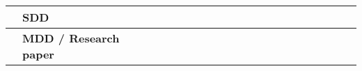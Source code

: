 \begin{table}[ht!]
\begin{tabular}{lp{2.5in}|llllllllllllllllllll|}
    \multicolumn{1}{|l|}{\cellcolor[HTML]{00E2FF}\textbf{}}                & \cellcolor[HTML]{00E2FF}\textbf{SDD}                                       & \multicolumn{1}{l|}{}                                   & \multicolumn{1}{l|}{}                                   & \multicolumn{1}{l|}{}                                   & \multicolumn{1}{l|}{\cellcolor[HTML]{F8A102}}           & \multicolumn{1}{l|}{\cellcolor[HTML]{F8A102}}           & \multicolumn{1}{l|}{\cellcolor[HTML]{F8A102}}           & \multicolumn{1}{l|}{}                                   & \multicolumn{1}{l|}{}                                   & \multicolumn{1}{l|}{}                                   & \multicolumn{1}{l|}{}                                    & \multicolumn{1}{l|}{}                                    & \multicolumn{1}{l|}{}                                    & \multicolumn{1}{l|}{}                                    & \multicolumn{1}{l|}{}                                    & \multicolumn{1}{l|}{}                                    & \multicolumn{1}{l|}{}                                    & \multicolumn{1}{l|}{}                                    & \multicolumn{1}{l|}{}                                    & \multicolumn{1}{l|}{}                                    &             \\ \hline
    \multicolumn{1}{|l|}{\cellcolor[HTML]{00E2FF}\textbf{}}                & \cellcolor[HTML]{00E2FF}\textbf{MDD / Research paper}                                       & \multicolumn{1}{l|}{}                                   & \multicolumn{1}{l|}{}                                   & \multicolumn{1}{l|}{}                                   & \multicolumn{1}{l|}{}                                   & \multicolumn{1}{l|}{}                                   & \multicolumn{1}{l|}{}                                   & \multicolumn{1}{l|}{\cellcolor[HTML]{F8A102}}           & \multicolumn{1}{l|}{\cellcolor[HTML]{F8A102}}           & \multicolumn{1}{l|}{\cellcolor[HTML]{F8A102}}           & \multicolumn{1}{l|}{\cellcolor[HTML]{F8A102}}            & \multicolumn{1}{l|}{\cellcolor[HTML]{F8A102}}            & \multicolumn{1}{l|}{\cellcolor[HTML]{F8A102}}            & \multicolumn{1}{l|}{\cellcolor[HTML]{F8A102}}            & \multicolumn{1}{l|}{\cellcolor[HTML]{F8A102}}            & \multicolumn{1}{l|}{\cellcolor[HTML]{F8A102}}            & \multicolumn{1}{l|}{\cellcolor[HTML]{F8A102}}            & \multicolumn{1}{l|}{\cellcolor[HTML]{F8A102}}            & \multicolumn{1}{l|}{\cellcolor[HTML]{F8A102}}            & \multicolumn{1}{l|}{}                                    &             \\ \hline

\end{tabular}
\end{table}
